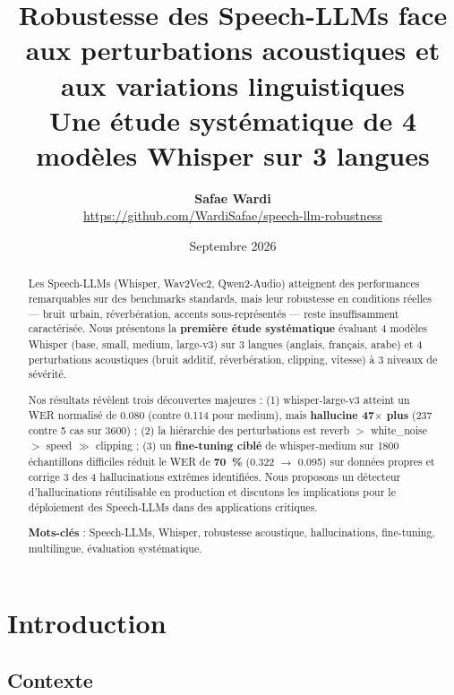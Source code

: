 \documentclass[11pt,a4paper]{article}
\title{
    \vspace{-1cm}
    \textbf{\Large Robustesse des Speech-LLMs face aux perturbations acoustiques et aux variations linguistiques} \\
    \vspace{0.3cm}
    \large Une étude systématique de 4 modèles Whisper sur 3 langues
    \vspace{-0.5cm}
}
\author{
    \textbf{Safae Wardi} \\
    \small \url{https://github.com/WardiSafae/speech-llm-robustness}
}
\date{Septembre 2026}
\begin{document}
\maketitle

\begin{abstract}
	\noindent
	Les Speech-LLMs (Whisper, Wav2Vec2, Qwen2-Audio) atteignent des performances
	remarquables sur des benchmarks standards, mais leur robustesse en conditions
	réelles --- bruit urbain, réverbération, accents sous-représentés --- reste
	insuffisamment caractérisée. Nous présentons la \textbf{première étude
		systématique} évaluant 4 modèles Whisper (base, small, medium, large-v3) sur
	3 langues (anglais, français, arabe) et 4 perturbations acoustiques
	(bruit additif, réverbération, clipping, vitesse) à 3 niveaux de sévérité.
	
	Nos résultats révèlent trois découvertes majeures : (1) whisper-large-v3
	atteint un WER normalisé de 0.080 (contre 0.114 pour medium), mais
	\textbf{hallucine 47$\times$ plus} (237 contre 5 cas sur 3600) ;
	(2) la hiérarchie des perturbations est reverb $>$ white\_noise $>$ speed
	$\gg$ clipping ; (3) un \textbf{fine-tuning ciblé} de whisper-medium sur
	1800 échantillons difficiles réduit le WER de \textbf{70~\%} (0.322 $\to$
	0.095) sur données propres et corrige 3 des 4 hallucinations extrêmes
	identifiées. Nous proposons un détecteur d'hallucinations réutilisable en
	production et discutons les implications pour le déploiement des Speech-LLMs
	dans des applications critiques.
	
	\vspace{0.3cm}
	\noindent
	\textbf{Mots-clés} : Speech-LLMs, Whisper, robustesse acoustique,
	hallucinations, fine-tuning, multilingue, évaluation systématique.
\end{abstract}

\section{Introduction}

\subsection{Contexte}
\end{document}
